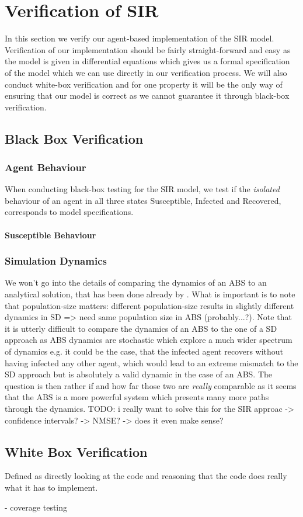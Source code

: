 \section{Verification of SIR}
In this section we verify our agent-based implementation of the SIR model. Verification of our implementation should be fairly straight-forward and easy as the model is given in differential equations which gives us a formal specification of the model which we can use directly in our verification process. We will also conduct white-box verification and for one property it will be the only way of ensuring that our model is correct as we cannot guarantee it through black-box verification.

\subsection{Black Box Verification}
\subsubsection{Agent Behaviour}
When conducting black-box testing for the SIR model, we test if the \textit{isolated} behaviour of an agent in all three states Susceptible, Infected and Recovered, corresponds to model specifications. 

\paragraph{Susceptible Behaviour}


\subsubsection{Simulation Dynamics}
We won't go into the details of comparing the dynamics of an ABS to an analytical solution, that has been done already by \cite{macal_agent-based_2010}. What is important is to note that population-size matters: different population-size results in slightly different dynamics in SD => need same population size in ABS (probably...?). Note that it is utterly difficult to compare the dynamics of an ABS to the one of a SD approach as ABS dynamics are stochastic which explore a much wider spectrum of dynamics e.g. it could be the case, that the infected agent recovers without having infected any other agent, which would lead to an extreme mismatch to the SD approach but is absolutely a valid dynamic in the case of an ABS. The question is then rather if and how far those two are \textit{really} comparable as it seems that the ABS is a more powerful system which presents many more paths through the dynamics.
TODO: i really want to solve this for the SIR approac
	-> confidence intervals?
	-> NMSE?
	-> does it even make sense?

\subsection{White Box Verification}
Defined as directly looking at the code and reasoning that the code does really what it has to implement.

- coverage testing